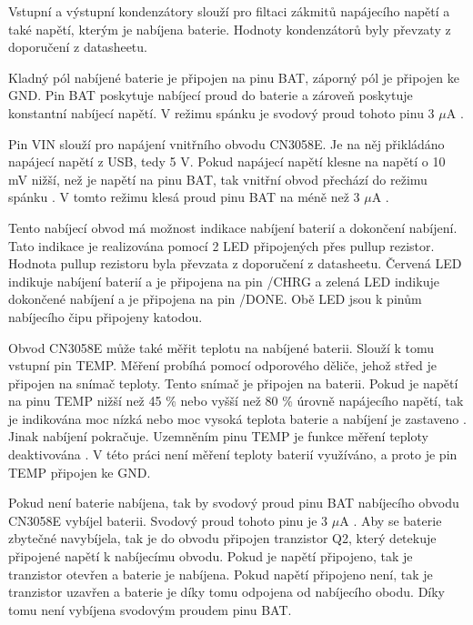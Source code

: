 
Vstupní a výstupní kondenzátory slouží pro filtaci zákmitů napájecího napětí a také napětí, kterým je nabíjena baterie. Hodnoty kondenzátorů byly převzaty
z doporučení z datasheetu.

Kladný pól nabíjené baterie je připojen na pinu BAT, záporný pól je připojen ke GND. Pin BAT poskytuje nabíjecí proud do baterie a zároveň poskytuje konstantní 
nabíjecí napětí. V režimu spánku je svodový proud tohoto pinu 3 $\mu$A \cite{charger_dtsh}. 

Pin VIN slouží pro napájení vnitřního obvodu CN3058E. Je na něj přikládáno napájecí napětí z USB, tedy 5 V. Pokud napájecí napětí klesne na napětí o 10 mV nižší, 
než je napětí na pinu BAT, tak vnitřní obvod přechází do režimu spánku \cite{charger_dtsh}. V tomto režimu klesá proud pinu BAT na méně než 3 $\mu$A \cite{charger_dtsh}.

Tento nabíjecí obvod má možnost indikace nabíjení baterií a dokončení nabíjení. Tato indikace je realizována pomocí 2 LED připojených přes pullup rezistor. Hodnota
pullup rezistoru byla převzata z doporučení z datasheetu. Červená LED indikuje nabíjení baterií a je připojena na pin /CHRG a zelená LED indikuje dokončené nabíjení 
a je připojena na pin /DONE. Obě LED jsou k pinům nabíjecího čipu připojeny katodou. 

Obvod CN3058E může také měřit teplotu na nabíjené baterii. Slouží k tomu vstupní pin TEMP. Měření probíhá pomocí odporového děliče, jehož střed je připojen na snímač 
teploty. Tento snímač je připojen na baterii. Pokud je napětí na pinu TEMP nižší než 45 \% nebo vyšší než 80 \% úrovně napájecího napětí, tak je indikována moc nízká
nebo moc vysoká teplota baterie a nabíjení je zastaveno \cite{charger_dtsh}. Jinak nabíjení pokračuje. Uzemněním pinu TEMP je funkce měření teploty deaktivována 
\cite{charger_dtsh}. V této práci není měření teploty baterií využíváno, a proto je pin TEMP připojen ke GND. 


Pokud není baterie nabíjena, tak by svodový proud pinu BAT nabíjecího obvodu CN3058E vybíjel baterii. Svodový proud tohoto pinu je 3 $\mu$A \cite{charger_dtsh}. 
Aby se baterie zbytečné navybíjela, tak je do obvodu připojen tranzistor Q2, který detekuje připojené napětí k nabíjecímu obvodu. Pokud je napětí připojeno, tak je 
tranzistor otevřen a baterie je nabíjena. Pokud napětí připojeno není, tak je tranzistor uzavřen a baterie je díky tomu odpojena od nabíjecího obodu. Díky tomu 
není vybíjena svodovým proudem pinu BAT. 

